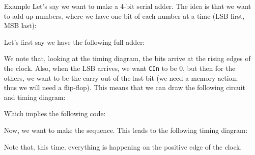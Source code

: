 \documentclass[a4paper]{article}
\begin{document}
\begin{parag}{Example}
    Let's say we want to make a 4-bit serial adder. The idea is that we want to add up numbers, where we have one bit of each number at a time (LSB first, MSB last):

    Let's first say we have the following full adder:

    We note that, looking at the timing diagram, the bits arrive at the rising edges of the clock. Also, when the LSB arrives, we want \texttt{CIn} to be 0, but then for the others, we want to be the carry out of the last bit (we need a memory action, thus we will need a flip-flop). This means that we can draw the following circuit and timing diagram:

    Which implies the following code:
    
    Now, we want to make the sequence. This leads to the following timing diagram: 

    Note that, this time, everything is happening on the positive edge of the clock.

\end{parag}
\end{document}
